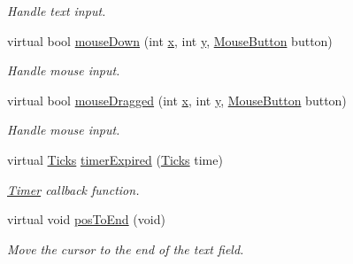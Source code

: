 \begin{DoxyCompactItemize}
\begin{DoxyCompactList}\small\item\em Handle text input. \end{DoxyCompactList}\item 
\hypertarget{classGUI_1_1Input_a19a657d7f5526764acab71891fad0f17}{virtual bool \hyperlink{classGUI_1_1Input_a19a657d7f5526764acab71891fad0f17}{mouse\-Down} (int \hyperlink{classGUI_1_1Window_a6ca6a80ca00c9e1d8ceea8d3d99a657d}{x}, int \hyperlink{classGUI_1_1Window_a0ee8e923aff2c3661fc2e17656d37adf}{y}, \hyperlink{namespaceGUI_ad06082a7b02aa73697f39eb8e0856de9}{Mouse\-Button} button)}\label{classGUI_1_1Input_a19a657d7f5526764acab71891fad0f17}

\begin{DoxyCompactList}\small\item\em Handle mouse input. \end{DoxyCompactList}\item 
\hypertarget{classGUI_1_1Input_acb06c8cc98dad0e5ffec6e0fd4b4801d}{virtual bool \hyperlink{classGUI_1_1Input_acb06c8cc98dad0e5ffec6e0fd4b4801d}{mouse\-Dragged} (int \hyperlink{classGUI_1_1Window_a6ca6a80ca00c9e1d8ceea8d3d99a657d}{x}, int \hyperlink{classGUI_1_1Window_a0ee8e923aff2c3661fc2e17656d37adf}{y}, \hyperlink{namespaceGUI_ad06082a7b02aa73697f39eb8e0856de9}{Mouse\-Button} button)}\label{classGUI_1_1Input_acb06c8cc98dad0e5ffec6e0fd4b4801d}

\begin{DoxyCompactList}\small\item\em Handle mouse input. \end{DoxyCompactList}\item 
\hypertarget{classGUI_1_1Input_a71fe106bc0e16593414b5b94cfe2893c}{virtual \hyperlink{namespaceGUI_af396fee5d5c26b98218f5803f85e3b65}{Ticks} \hyperlink{classGUI_1_1Input_a71fe106bc0e16593414b5b94cfe2893c}{timer\-Expired} (\hyperlink{namespaceGUI_af396fee5d5c26b98218f5803f85e3b65}{Ticks} time)}\label{classGUI_1_1Input_a71fe106bc0e16593414b5b94cfe2893c}

\begin{DoxyCompactList}\small\item\em \hyperlink{classGUI_1_1Timer}{Timer} callback function. \end{DoxyCompactList}\item 
\hypertarget{classGUI_1_1Input_a98bf8ee0e5ccb2e6a387fd1a463b60cd}{virtual void \hyperlink{classGUI_1_1Input_a98bf8ee0e5ccb2e6a387fd1a463b60cd}{pos\-To\-End} (void)}\label{classGUI_1_1Input_a98bf8ee0e5ccb2e6a387fd1a463b60cd}

\begin{DoxyCompactList}\small\item\em Move the cursor to the end of the text field. \end{DoxyCompactList}\end{DoxyCompactItemize}
